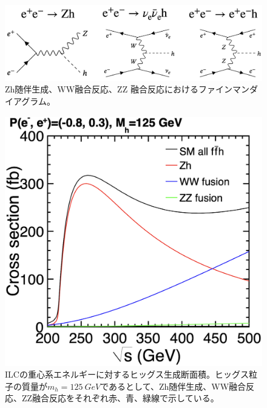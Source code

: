 \begin{figure}[h]
\begin{center}
 \includegraphics[keepaspectratio, scale=0.18]
 	{Figure/Introduction/higgs_cs_feynman.png}
	\caption{Zh随伴生成、WW融合反応、ZZ 融合反応におけるファインマンダイアグラム\cite{tdr2}。}
\end{center}
\end{figure}

\begin{figure}[H]
	\begin{center}
 \includegraphics[keepaspectratio, scale=0.2]
 	{Figure/Introduction/hcs.png}
	 	\caption{ILCの重心系エネルギーに対するヒッグス生成断面積。ヒッグス粒子の質量が$m_h=\SI{125}{GeV}$であるとして、Zh随伴生成、WW融合反応、ZZ融合反応をそれぞれ赤、青、緑線で示している\cite{tdr2}。}
 	\label{hcs}
	\end{center}
 \end{figure}
 
